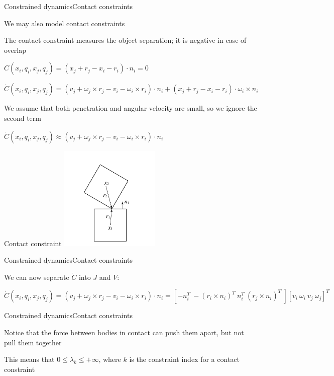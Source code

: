 \documentclass{beamer}
\begin{document}
\begin{slide}{Constrained dynamics}{Contact constraints}{
\item We may also model contact constraints
\item The contact constraint measures the object separation; it is negative in case of overlap
\item $C(x_i,q_i,x_j,q_j) = (x_j + r_j - x_i - r_i) \cdot n_i = 0$
\item $\dot C(x_i,q_i,x_j,q_j) = (v_j + \omega_j \times r_j - v_i - \omega_i \times r_i) \cdot n_i + (x_j + r_j - x_i - r_i) \cdot \omega_i \times n_i$
\item We assume that both penetration and angular velocity are small, so we ignore the second term
\item $\dot C(x_i,q_i,x_j,q_j) \approx (v_j + \omega_j \times r_j - v_i - \omega_i \times r_i) \cdot n_i$
}\end{slide}

\begin{frame}{Contact constraint}
\center
\includegraphics[height=5cm]{Pics/ContactConstraint.png}
\end{frame}

\begin{slide}{Constrained dynamics}{Contact constraints}{
\item We can now separate $\dot C$ into $J$ and $V$:
\item $\dot C(x_i,q_i,x_j,q_j) = (v_j + \omega_j \times r_j - v_i - \omega_i \times r_i) \cdot n_i = \left[ -n_i^T\ -(r_i \times n_i)^T\ n_i^T\ (r_j \times n_i)^T\ \right] \left[ v_i\ \omega_i\ v_j\ \omega_j \right]^T$
}\end{slide}

\begin{slide}{Constrained dynamics}{Contact constraints}{
\item Notice that the force between bodies in contact can push them apart, but not pull them together
\item This means that $0 \leq \lambda_k \leq +\infty$, where $k$ is the constraint index for a contact constraint
}\end{slide}
\end{document}
